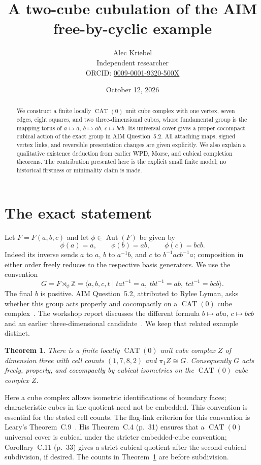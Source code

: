 \documentclass[11pt]{article}
\title{A two-cube cubulation of the AIM free-by-cyclic example}
\author{Alec Kriebel\\Independent researcher\\\small ORCID: \href{https://orcid.org/0009-0001-9320-500X}{0009-0001-9320-500X}}
\date{October 12, 2026}
\newtheorem{theorem}{Theorem}
\newcommand{\CAT}{\operatorname{CAT}}
\begin{document}
\maketitle
\begin{abstract}
We construct a finite locally $\CAT(0)$ unit cube complex with one vertex,
seven edges, eight squares, and two three-dimensional cubes, whose fundamental
group is the mapping torus of $a\mapsto a$, $b\mapsto ab$, $c\mapsto bcb$.
Its universal cover gives a proper cocompact cubical action of the exact
group in AIM Question~5.2. All attaching maps, signed vertex links, and
reversible presentation changes are given explicitly. We also explain a
qualitative existence deduction from earlier WPD, Morse, and cubical
completion theorems. The contribution presented here is the explicit small
finite model; no historical firstness or minimality claim is made.
\end{abstract}

\section{The exact statement}

Let $F=F(a,b,c)$ and let $\phi\in\operatorname{Aut}(F)$ be given by
\[
 \phi(a)=a,\qquad \phi(b)=ab,\qquad \phi(c)=bcb.
\]
Indeed its inverse sends $a$ to $a$, $b$ to $a^{-1}b$, and $c$ to
$b^{-1}acb^{-1}a$; composition in either order freely reduces to the
respective basis generators. We use the convention
\begin{equation}\label{eq:G}
 G=F\rtimes_\phi\mathbb Z
 =\langle a,b,c,t\mid tat^{-1}=a,\ tbt^{-1}=ab,\ tct^{-1}=bcb\rangle.
\end{equation}
The final $b$ is positive. AIM Question~5.2, attributed to Rylee Lyman,
asks whether this group acts properly and cocompactly on a $\CAT(0)$ cube
complex~\cite{AIM}. The workshop report discusses the different formula
$b\mapsto aba$, $c\mapsto bcb$ and an earlier three-dimensional
candidate~\cite[p.~2]{workshop}. We keep that related example distinct.

\begin{theorem}\label{thm:main}
There is a finite locally $\CAT(0)$ unit cube complex $Z$ of dimension three
with cell counts $(1,7,8,2)$ and $\pi_1Z\cong G$. Consequently $G$ acts
freely, properly, and cocompactly by cubical isometries on the $\CAT(0)$
cube complex $\widetilde Z$.
\end{theorem}

Here a cube complex allows isometric identifications of boundary faces;
characteristic cubes in the quotient need not be embedded. This convention
is essential for the stated cell counts. The flag-link criterion for this
convention is Leary's Theorem~C.9~\cite[p.~33]{Leary}. His Theorem~C.4
(p.~31) ensures that a $\CAT(0)$ universal cover is cubical under the
stricter embedded-cube convention; Corollary~C.11 (p.~33) gives a strict
cubical quotient after the second cubical subdivision, if desired. The
counts in Theorem~\ref{thm:main} are before subdivision.
\end{document}
